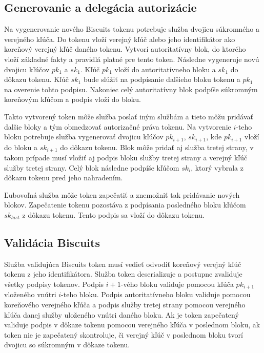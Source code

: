 \subsection{Generovanie a delegácia autorizácie}

Na vygenerovanie nového Biscuits tokenu potrebuje služba dvojicu súkromného a verejného kľúča. Do tokenu vloží verejný kľúč alebo jeho identifikátor ako koreňový verejný kľúč daného tokenu. Vytvorí autoritatívny blok, do ktorého vloží základné fakty a pravidlá platné pre tento token. Následne vygeneruje novú dvojicu kľúčov $pk_1$ a $sk_1$. Kľúč $pk_1$ vloží do autoritatívneho bloku a $sk_1$ do dôkazu tokenu. Kľúč $sk_1$ bude slúžiť na podpísanie ďalšieho bloku tokenu a $pk_1$ na overenie tohto podpisu. Nakoniec celý autoritatívny blok podpíše súkromným koreňovým kľúčom a podpis vloží do bloku.

Takto vytvorený token môže služba poslať iným službám a tieto môžu pridávať ďalšie bloky a tým obmedzovať autorizačné práva tokenu. Na vytvorenie $i$-teho bloku potrebuje služba vygenerovať dvojicu kľúčov $pk_{i+1}$, $sk_{i+1}$, kde $pk_{i+1}$ vloží do bloku a $sk_{i+1}$ do dôkazu tokenu. Blok môže pridať aj služba tretej strany, v takom prípade musí vložiť aj podpis bloku služby tretej strany a verejný kľúč služby tretej strany. Celý blok následne podpíše kľúčom $sk_i$, ktorý vybrala z dôkazu tokenu pred jeho nahradením.

Ľubovoľná služba môže token zapečatiť a znemožniť tak pridávanie nových blokov. Zapečatenie tokenu pozostáva z podpísania posledného bloku kľúčom $sk_{last}$ z dôkazu tokenu. Tento podpis sa vloží do dôkazu tokenu.

\subsection{Validácia Biscuits}

Služba validujúca Biscuits token musí vedieť odvodiť koreňový verejný kľúč tokenu z jeho identifikátora. Služba token deserializuje a postupne zvaliduje všetky podpisy tokenov. Podpis $i+1$-vého bloku validuje pomocou kľúča $pk_{i+1}$ vloženého vnútri $i$-teho bloku. Podpis autoritatívneho bloku validuje pomocou koreňového verejného kľúča a podpis služby tretej strany pomocou verejného kľúča danej služby uloženého vnútri daného bloku. Ak je token zapečatený validuje podpis v dôkaze tokenu pomocou verejného kľúča v poslednom bloku, ak token nie je zapečatený skontroluje, či verejný kľúč v poslednom bloku tvorí dvojicu so súkromným v dôkaze tokenu.

